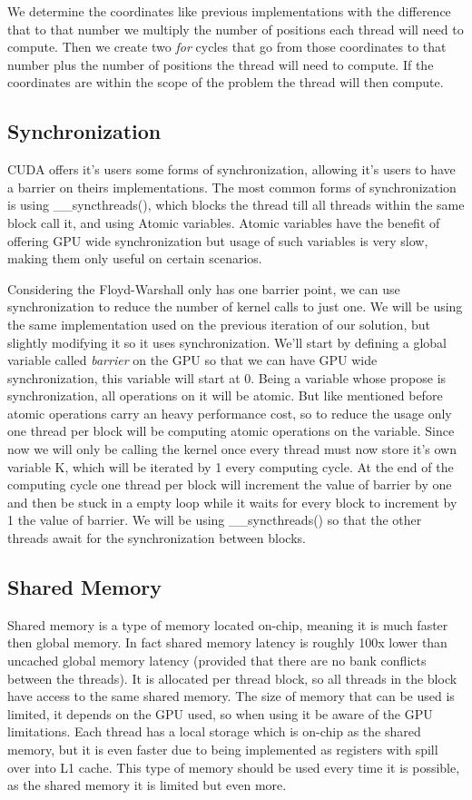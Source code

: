 \documentclass[runningheads]{llncs}
\begin{document}
We determine the coordinates like previous implementations with the difference that to that number we multiply the number of positions each thread will need to compute. %
Then we create two \textit{for} cycles that go from those coordinates to that number plus the number of positions the thread will need to compute. If the coordinates are within the scope of the problem the thread will then compute.

\subsection{Synchronization}

CUDA offers it's users some forms of synchronization, allowing it's users to have a barrier on theirs implementations.
The most common forms of synchronization is using \_\_syncthreads(), which blocks the thread till all threads within the same block call it, and using Atomic variables. Atomic variables have the benefit of offering GPU wide synchronization but usage of such variables is very slow, making them only useful on certain scenarios.

Considering the Floyd-Warshall only has one barrier point, we can use synchronization to reduce the number of kernel calls to just one.
We will be using the same implementation used on the previous iteration of our solution, but slightly modifying it so it uses synchronization.
We'll start by defining a global variable called \textit{barrier} on the GPU so that we can have GPU wide synchronization, this variable will start at 0. 
Being a variable whose propose is synchronization, all operations on it will be atomic. 
But like mentioned before atomic operations carry an heavy performance cost, so to reduce the usage only one thread per block will be computing atomic operations on the variable.
Since now we will only be calling the kernel once every thread must now store it's own variable K, which will be iterated by 1 every computing cycle. 
At the end of the computing cycle one thread per block will increment the value of barrier by one and then be stuck in a empty loop while it waits for every block to increment by 1 the value of barrier. 
We will be using \_\_syncthreads() so that the other threads await for the synchronization between blocks.


\subsection{Shared Memory}
Shared memory is a type of memory located on-chip, meaning it is much faster then global memory. In fact shared memory latency is roughly 
100x lower than uncached global memory latency (provided that there are no bank conflicts between the threads). It is allocated per 
thread block, so all threads in the block have access to the same shared memory. The size of memory that can be used is limited, it depends on the GPU
used, so when using it be aware of the GPU limitations.
Each thread has a local storage which is on-chip as the shared memory, but it is even faster due to being implemented as registers with spill over
into L1 cache. This type of memory should be used every time it is possible, as the shared memory it is limited but even more.
\end{document}
